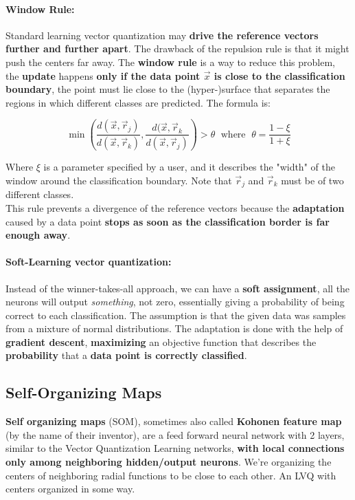 \paragraph{Window Rule:} Standard learning vector quantization may \textbf{drive the reference vectors further and further apart}. The drawback of the repulsion rule is that it might push the centers far away. The \textbf{window rule} is a way to reduce this problem, the \textbf{update} happens \textbf{only if the data point $\vec{x}$ is close to the classification boundary}, the point must lie close to the (hyper-)surface that separates the regions in which different classes are predicted. The formula is:

$$ \min\left(\frac{d(\vec{x}, \vec{r}_j)}{d(\vec{x}, \vec{r}_k)}, \frac{d(\vec{x}, \vec{r}_k}{d(\vec{x}, \vec{r}_j)}\right) > \theta \; \text{ where } \; \theta = \frac{1 - \xi}{1 + \xi} $$

Where $\xi$ is a parameter specified by a user, and it describes the "width" of the window around the classification boundary. Note that $\vec{r}_j$ and $\vec{r}_k$ must be of two different classes.\\

This rule prevents a divergence of the reference vectors because the \textbf{adaptation} caused by a data point \textbf{stops as soon as the classification border is far enough away}.\\

\paragraph{Soft-Learning vector quantization:} Instead of the winner-takes-all approach, we can have a \textbf{soft assignment}, all the neurons will output \textit{something}, not zero, essentially giving a probability of being correct to each classification. The assumption is that the given data was samples from a mixture of normal distributions. The adaptation is done with the help of \textbf{gradient descent}, \textbf{maximizing} an objective function that describes the \textbf{probability} that a \textbf{data point is correctly classified}.


\newpage

\subsection{Self-Organizing Maps}
\textbf{Self organizing maps} (SOM), sometimes also called \textbf{Kohonen feature map} (by the name of their inventor), are a feed forward neural network with 2 layers, similar to the Vector Quantization Learning networks, \textbf{with local connections only among neighboring hidden/output neurons}. We're organizing the centers of neighboring radial functions to be close to each other. An LVQ with centers organized in some way. \\

